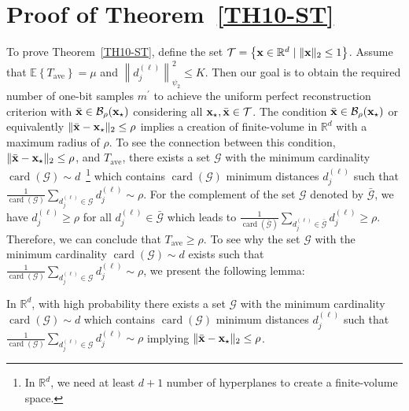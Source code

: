 \documentclass[12pt,draftcls,onecolumn]{IEEEtran}
\begin{document}
\section{Proof of Theorem~\ref{TH10-ST}}
\label{ealmaz}
To prove Theorem~\ref{TH10-ST}, define the set $\mathcal{T}=\left\{\mathbf{x}\in\mathbb{R}^d\mid \|\mathbf{x}\|_2\leq 1\right\}$. 
Assume that $\mathbb{E}\left\{T_{\mathrm{ave}}\right\}=\mu$ and $\left\|d_j^{(\ell)}\right\|_{\psi_2}^2\leq K$. Then our goal is to obtain the required number of one-bit samples $m^{\prime}$ to achieve the uniform perfect reconstruction criterion with $\bar{\mathbf{x}}\in\mathcal{B}_{\rho}(\mathbf{x}_{\star})$ considering all $\mathbf{x}_{\star},\bar{\mathbf{x}}\in\mathcal{T}$. The condition $\bar{\mathbf{x}}\in\mathcal{B}_{\rho}(\mathbf{x}_{\star})$ or equivalently $\|\bar{\mathbf{x}}-\mathbf{x}_{\star}\|_2\leq\rho$ implies a creation of finite-volume in $\mathbb{R}^d$ with a maximum radius of $\rho$.
To see the connection between this condition, $\|\bar{\mathbf{x}}-\mathbf{x}_{\star}\|_2\leq\rho$, and $T_{\mathrm{ave}}$, there exists a set $\mathcal{G}$ with the minimum cardinality $\operatorname{card}(\mathcal{G})\sim d$~\footnote{In $\mathbb{R}^d$, we need at least $d+1$ number of hyperplanes to create a finite-volume space.} which contains $\operatorname{card}(\mathcal{G})$ minimum distances $d_j^{(\ell)}$ such that $\frac{1}{\operatorname{card}(\mathcal{G})}\sum_{d_j^{(\ell)}\in\mathcal{G}}d_j^{(\ell)}\sim\rho$. For the complement of the set $\mathcal{G}$ denoted by $\bar{\mathcal{G}}$, we have $d_j^{(\ell)}\geq\rho$ for all $d_j^{(\ell)}\in\bar{\mathcal{G}}$ which leads to $\frac{1}{\operatorname{card}(\bar{\mathcal{G}})}\sum_{d_j^{(\ell)}\in\bar{\mathcal{G}}}d_j^{(\ell)}\geq\rho$. Therefore, we can conclude that $T_{\mathrm{ave}}\geq\rho$. To see why the set $\mathcal{G}$ with the minimum cardinality $\operatorname{card}(\mathcal{G})\sim d$ exists such that $\frac{1}{\operatorname{card}(\mathcal{G})}\sum_{d_j^{(\ell)}\in\mathcal{G}}d_j^{(\ell)}\sim\rho$, we present the following lemma:
\begin{lemma}
\label{gol}
In $\mathbb{R}^d$, with high probability 
there exists a set $\mathcal{G}$ with the minimum cardinality $\operatorname{card}(\mathcal{G})\sim d$ which contains $\operatorname{card}(\mathcal{G})$ minimum distances $d_j^{(\ell)}$ such that $\frac{1}{\operatorname{card}(\mathcal{G})}\sum_{d_j^{(\ell)}\in\mathcal{G}}d_j^{(\ell)}\sim\rho$ implying $\|\bar{\mathbf{x}}-\mathbf{x}_{\star}\|_2\leq\rho$.
\end{lemma}
\end{document}
